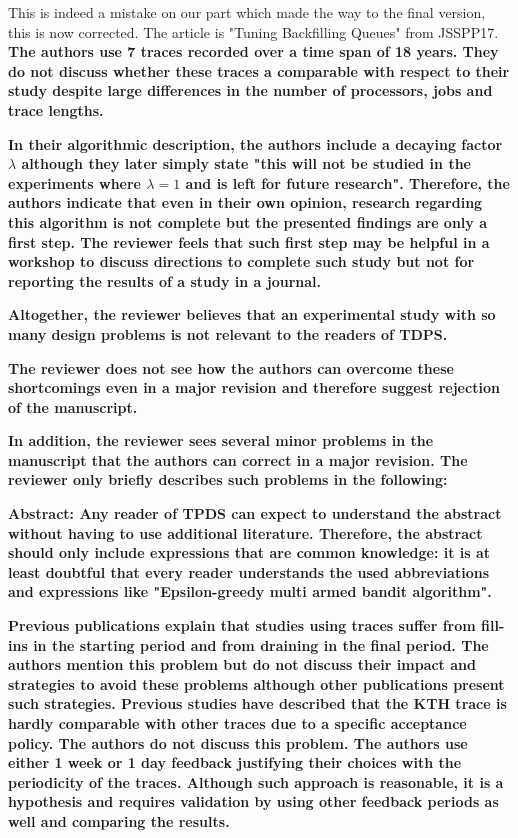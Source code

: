 \documentclass[]{article}
\begin{document}
This is indeed a mistake on our part which made the way to the final version,
this is now corrected. The article is "Tuning Backfilling Queues" from JSSPP17.\\

\textbf{The authors use 7 traces recorded over a time span of 18 years. They do
not discuss whether these traces a comparable with respect to their study
despite large differences in the number of processors, jobs and trace lengths.}

\textbf{In their algorithmic description, the authors include a decaying factor
$\lambda$ although they later simply state "this will not be studied in the
experiments where $\lambda=1$ and is left for future research". Therefore, the
authors indicate that even in their own opinion, research regarding this
algorithm is not complete but the presented findings are only a first step. The
reviewer feels that such first step may be helpful in a workshop to discuss
directions to complete such study but not for reporting the results of a study
in a journal. }

\textbf{Altogether, the reviewer believes that an experimental study with so
many design problems is not relevant to the readers of TDPS. }

\textbf{The reviewer does not see how the authors can overcome these
shortcomings even in a major revision and therefore suggest rejection of the
manuscript.}

\textbf{In addition, the reviewer sees several minor problems in the manuscript
that the authors can correct in a major revision. The reviewer only briefly
describes such problems in the following:}

\textbf{Abstract: Any reader of TPDS can expect to understand the abstract
without having to use additional literature. Therefore, the abstract should
only include expressions that are common knowledge: it is at least doubtful
that every reader understands the used abbreviations and expressions like
"Epsilon-greedy multi armed bandit algorithm". }

\textbf{Previous publications explain that studies using traces suffer from
fill-ins in the starting period and from draining in the final period. The
authors mention this problem but do not discuss their impact and strategies to
avoid these problems although other publications present such strategies.
Previous studies have described that the KTH trace is hardly comparable with
other traces due to a specific acceptance policy. The authors do not discuss
this problem. The authors use either 1 week or 1 day feedback justifying their
choices with the periodicity of the traces. Although such approach is
reasonable, it is a hypothesis and requires validation by using other feedback
periods as well and comparing the results. }
\end{document}
